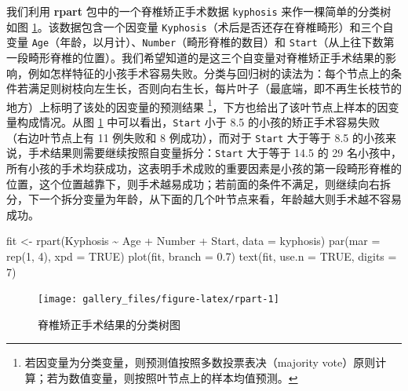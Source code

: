 \documentclass[
  b5paper,
  UTF8,twoside]{book}
\newenvironment{Shaded}{\begin{snugshade}}{\end{snugshade}}
\newcommand{\AttributeTok}[1]{\textcolor[rgb]{0.77,0.63,0.00}{#1}}
\newcommand{\ConstantTok}[1]{\textcolor[rgb]{0.00,0.00,0.00}{#1}}
\newcommand{\DecValTok}[1]{\textcolor[rgb]{0.00,0.00,0.81}{#1}}
\newcommand{\FloatTok}[1]{\textcolor[rgb]{0.00,0.00,0.81}{#1}}
\newcommand{\FunctionTok}[1]{\textcolor[rgb]{0.00,0.00,0.00}{#1}}
\newcommand{\NormalTok}[1]{#1}
\newcommand{\OtherTok}[1]{\textcolor[rgb]{0.56,0.35,0.01}{#1}}
\newcommand{\SpecialCharTok}[1]{\textcolor[rgb]{0.00,0.00,0.00}{#1}}
\begin{document}
我们利用 \textbf{rpart} 包中的一个脊椎矫正手术数据 \texttt{kyphosis} 来作一棵简单的分类树如图 \ref{fig:rpart}。该数据包含一个因变量 \texttt{Kyphosis}（术后是否还存在脊椎畸形）和三个自变量 \texttt{Age}（年龄，以月计）、\texttt{Number}（畸形脊椎的数目）和 \texttt{Start}（从上往下数第一段畸形脊椎的位置）。我们希望知道的是这三个自变量对脊椎矫正手术结果的影响，例如怎样特征的小孩手术容易失败。分类与回归树的读法为：每个节点上的条件若满足则树枝向左生长，否则向右生长，每片叶子（最底端，即不再生长枝节的地方）上标明了该处的因变量的预测结果 \footnote{若因变量为分类变量，则预测值按照多数投票表决（majority vote）原则计算；若为数值变量，则按照叶节点上的样本均值预测。}，下方也给出了该叶节点上样本的因变量构成情况。从图 \ref{fig:rpart} 中可以看出，\texttt{Start} 小于 8.5 的小孩的矫正手术容易失败（右边叶节点上有 11 例失败和 8 例成功），而对于 \texttt{Start} 大于等于 8.5 的小孩来说，手术结果则需要继续按照自变量拆分：\texttt{Start} 大于等于 14.5 的 29 名小孩中，所有小孩的手术均获成功，这表明手术成败的重要因素是小孩的第一段畸形脊椎的位置，这个位置越靠下，则手术越易成功；若前面的条件不满足，则继续向右拆分，下一个拆分变量为年龄，从下面的几个叶节点来看，年龄越大则手术越不容易成功。





\begin{Shaded}
\begin{Highlighting}[]
\NormalTok{fit }\OtherTok{\textless{}{-}} \FunctionTok{rpart}\NormalTok{(Kyphosis }\SpecialCharTok{\textasciitilde{}}\NormalTok{ Age }\SpecialCharTok{+}\NormalTok{ Number }\SpecialCharTok{+}\NormalTok{ Start, }\AttributeTok{data =}\NormalTok{ kyphosis)}
\FunctionTok{par}\NormalTok{(}\AttributeTok{mar =} \FunctionTok{rep}\NormalTok{(}\DecValTok{1}\NormalTok{, }\DecValTok{4}\NormalTok{), }\AttributeTok{xpd =} \ConstantTok{TRUE}\NormalTok{)}
\FunctionTok{plot}\NormalTok{(fit, }\AttributeTok{branch =} \FloatTok{0.7}\NormalTok{)}
\FunctionTok{text}\NormalTok{(fit, }\AttributeTok{use.n =} \ConstantTok{TRUE}\NormalTok{, }\AttributeTok{digits =} \DecValTok{7}\NormalTok{)}
\end{Highlighting}
\end{Shaded}

\begin{figure}

{\centering \texttt{[image: gallery\_files/figure-latex/rpart-1]} 

}

\caption[脊椎矫正手术结果的分类树图]{脊椎矫正手术结果的分类树图}\label{fig:rpart}
\end{figure}
\end{document}
